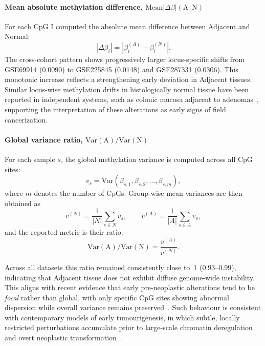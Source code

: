 \documentclass[10pt]{extarticle}
\begin{document}
\paragraph{Mean absolute methylation difference, $\text{Mean}|\Delta\beta|(\text{A--N})$}  
For each CpG I computed the absolute mean difference between Adjacent and Normal:
\[
|\Delta\beta_i| = \left| \beta^{(A)}_i - \beta^{(N)}_i \right|.
\]
The cross-cohort pattern shows progressively larger locus-specific shifts from GSE69914 
(0.0090) to GSE225845 (0.0148) and GSE287331 (0.0306).  
This monotonic increase reflects a strengthening early deviation in Adjacent tissues.  
Similar locus-wise methylation drifts in histologically normal tissue have been reported in 
independent systems, such as colonic mucosa adjacent to adenomas~\cite{Yates2024_NormalMucosaField}, 
supporting the interpretation of these alterations as early signs of field cancerization.

\paragraph{Global variance ratio, $\mathrm{Var(A)/Var(N)}$}  
For each sample $s$, the global methylation variance is computed across all CpG sites:
\[
v_s = \mathrm{Var}\!\left(\beta_{s,1}, \beta_{s,2}, \ldots, \beta_{s,m}\right),
\]
where $m$ denotes the number of CpGs.  
Group-wise mean variances are then obtained as
\[
\overline{v}^{(N)} = \frac{1}{|N|} \sum_{s \in N} v_s,
\qquad
\overline{v}^{(A)} = \frac{1}{|A|} \sum_{s \in A} v_s,
\]
and the reported metric is their ratio:
\[
\mathrm{Var(A)/Var(N)} = 
\frac{\overline{v}^{(A)}}{\overline{v}^{(N)}}.
\]

Across all datasets this ratio remained consistently close to~1 (0.93--0.99), indicating that 
Adjacent tissue does not exhibit diffuse genome-wide instability.  
This aligns with recent evidence that early pre-neoplastic alterations tend to be \emph{focal} 
rather than global, with only specific CpG sites showing abnormal dispersion while overall 
variance remains preserved~\cite{Yates2024_NormalMucosaField}.  
Such behaviour is consistent with contemporary models of early tumourigenesis, in which subtle, 
locally restricted perturbations accumulate prior to large-scale chromatin deregulation 
and overt neoplastic transformation~\cite{Zhang2024_TumorInitiationEpigenetic}.
\end{document}
